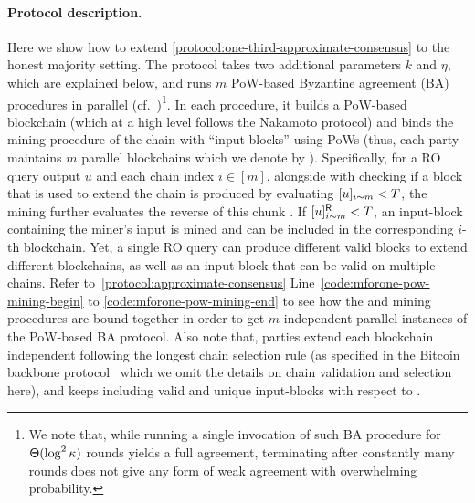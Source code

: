 \paragraph{Protocol description.}
%
Here we show how to extend \cref{protocol:one-third-approximate-consensus} to the honest majority setting.
%
The protocol takes two additional parameters $k$ and $\eta$, which are explained below, and runs $m$ PoW-based Byzantine agreement (BA) procedures in parallel (cf.~\cite{EC:GarKiaLeo15})\footnote{We note that, while running a single invocation of such BA procedure \cite{EC:GarKiaLeo15} for $\mathsf{\Theta}(\log^2 \kappa)$ rounds yields a full agreement, terminating after constantly many rounds does not give any form of weak agreement with overwhelming probability.}.
%
In each procedure, it builds a PoW-based blockchain (which at a high level follows the Nakamoto protocol) and binds the mining procedure of the chain with ``input-blocks'' using \twoforone PoWs (thus, each party maintains $m$ parallel blockchains which we denote by \parallelChains).
%
Specifically, for a RO query output $u$ and each chain index $i \in [m]$, alongside with checking if a block that is used to extend the chain is produced by evaluating $[u]_{i\sim m} < T$, the \twoforone mining further evaluates the reverse of this chunk .
%
If $[u]^{\mathsf{R}}_{i\sim m} < T$, an input-block  containing the miner's input is mined and  can be included in the corresponding $i$-th blockchain.
%
Yet, a single RO query can produce different valid blocks to extend different blockchains, as well as an input block that can be valid on multiple chains.
%
Refer to~\cref{protocol:approximate-consensus} Line~\ref*{code:mforone-pow-mining-begin} to \ref*{code:mforone-pow-mining-end} to see how the \mforone and \twoforone mining procedures are bound together in order to get $m$ independent parallel instances of the PoW-based BA protocol.
%
Also note that, parties extend each blockchain \chain independent following the longest chain selection rule (as specified in the Bitcoin backbone protocol~\cite{EC:GarKiaLeo15} which we omit the details on chain validation and selection here), and keeps including valid and unique input-blocks with respect to \chain.

